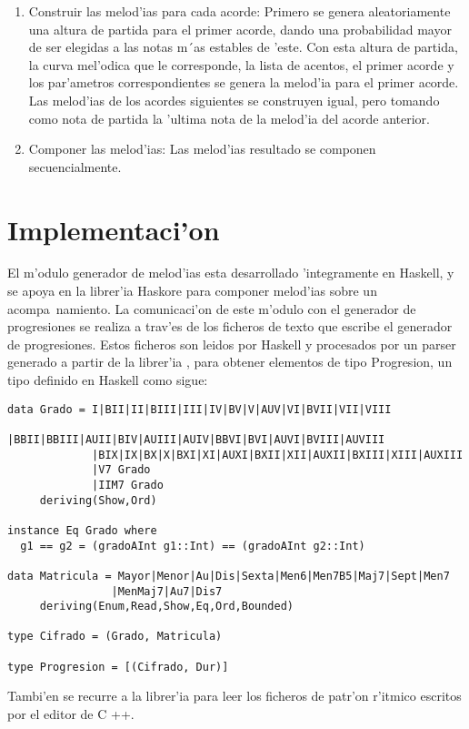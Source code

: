 \begin{enumerate}
	\item Construir las melod'ias para cada acorde: Primero se genera aleatoriamente una altura de partida para el primer acorde, dando una probabilidad mayor de ser elegidas a las notas m´as estables de 'este. Con esta altura de partida, la curva mel'odica que le corresponde, la lista de acentos, el primer acorde y los par'ametros correspondientes se genera la melod'ia para el primer acorde. Las melod'ias de los acordes siguientes se construyen igual, pero tomando como nota de partida la 'ultima nota de la melod'ia del acorde anterior.
	\item Componer las melod'ias: Las melod'ias resultado se componen secuencialmente.
        \end{enumerate}


\section{Implementaci'on}
El m'odulo generador de melod'ias esta desarrollado 'integramente en Haskell, y se apoya en la librer'ia Haskore \cite{hudak} para componer melod'ias sobre un acompa~namiento.
\newline
La comunicaci'on de este m'odulo con el generador de progresiones se realiza a trav'es de los ficheros de texto que escribe el generador de progresiones. Estos ficheros son leidos por Haskell y procesados por un parser generado a partir de la librer'ia \cite{fokker}, para obtener elementos de tipo Progresion, un tipo definido en Haskell como sigue:
        \begin{verbatim}
data Grado = I|BII|II|BIII|III|IV|BV|V|AUV|VI|BVII|VII|VIII
             |BBII|BBIII|AUII|BIV|AUIII|AUIV|BBVI|BVI|AUVI|BVIII|AUVIII
             |BIX|IX|BX|X|BXI|XI|AUXI|BXII|XII|AUXII|BXIII|XIII|AUXIII
             |V7 Grado
             |IIM7 Grado
     deriving(Show,Ord)

instance Eq Grado where
  g1 == g2 = (gradoAInt g1::Int) == (gradoAInt g2::Int)

data Matricula = Mayor|Menor|Au|Dis|Sexta|Men6|Men7B5|Maj7|Sept|Men7
                |MenMaj7|Au7|Dis7
     deriving(Enum,Read,Show,Eq,Ord,Bounded)

type Cifrado = (Grado, Matricula)

type Progresion = [(Cifrado, Dur)]
        \end{verbatim}
Tambi'en se recurre a la librer'ia \cite{fokker} para leer los ficheros de patr'on r'itmico escritos por el editor de C ++.
\newline

